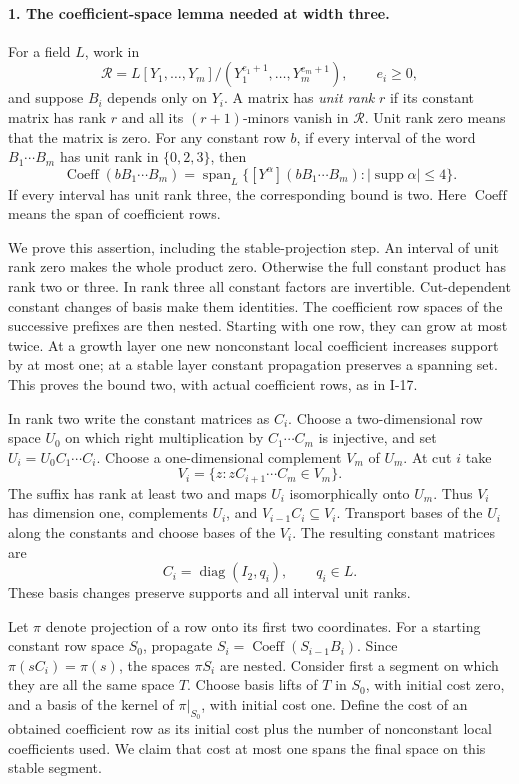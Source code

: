 \paragraph{1. The coefficient-space lemma needed at width three.}
For a field $L$, work in
\[
 \mathcal R=L[Y_1,\ldots,Y_m]/(Y_1^{e_1+1},\ldots,Y_m^{e_m+1}),
 \qquad e_i\ge0,
\]
and suppose $B_i$ depends only on $Y_i$.  A matrix has \emph{unit rank}
$r$ if its constant matrix has rank $r$ and all its $(r+1)$-minors
vanish in $\mathcal R$.  Unit rank zero means that the matrix is zero.
For any constant row $b$, if every interval of the word
$B_1\cdots B_m$ has unit rank in $\{0,2,3\}$, then
\[
 \operatorname{Coeff}(bB_1\cdots B_m)
   =\operatorname{span}_L
       \{[Y^\alpha](bB_1\cdots B_m):
                         |\operatorname{supp}\alpha|\le4\}.
 \tag{I.24}\label{eq:I-profile23}
\]
If every interval has unit rank three, the corresponding bound is two.
Here $\operatorname{Coeff}$ means the span of coefficient rows.

We prove this assertion, including the stable-projection step.
An interval of unit rank zero makes the whole product zero.  Otherwise
the full constant product has rank two or three.  In rank three all
constant factors are invertible.  Cut-dependent constant changes of
basis make them identities.  The coefficient row spaces of the
successive prefixes are then nested.  Starting with one row, they can
grow at most twice.  At a growth layer one new nonconstant local
coefficient increases support by at most one; at a stable layer
constant propagation preserves a spanning set.  This proves the
bound two, with actual coefficient rows, as in I-17.

In rank two write the constant matrices as $C_i$.  Choose a
two-dimensional row space $U_0$ on which right multiplication by
$C_1\cdots C_m$ is injective, and set $U_i=U_0C_1\cdots C_i$.
Choose a one-dimensional complement $V_m$ of $U_m$.  At cut $i$ take
\[
 V_i=\{z:zC_{i+1}\cdots C_m\in V_m\}.
\]
The suffix has rank at least two and maps $U_i$ isomorphically onto
$U_m$.  Thus $V_i$ has dimension one, complements $U_i$, and
$V_{i-1}C_i\subseteq V_i$.  Transport bases of the $U_i$ along the
constants and choose bases of the $V_i$.  The resulting constant
matrices are
\[
 C_i=\operatorname{diag}(I_2,q_i),\qquad q_i\in L.
 \tag{I.25}
\]
These basis changes preserve supports and all interval unit ranks.

Let $\pi$ denote projection of a row onto its first two coordinates.
For a starting constant row space $S_0$, propagate
$S_i=\operatorname{Coeff}(S_{i-1}B_i)$.  Since
$\pi(sC_i)=\pi(s)$, the spaces $\pi S_i$ are nested.
Consider first a segment on which they are all the same space $T$.
Choose basis lifts of $T$ in $S_0$, with initial cost zero, and a basis
of the kernel of $\pi|_{S_0}$, with initial cost one.  Define the cost
of an obtained coefficient row as its initial cost plus the number
of nonconstant local coefficients used.  We claim that cost at most
one spans the final space on this stable segment.

